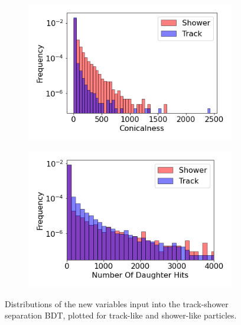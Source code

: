 \begin{figure}[bp!]
\begin{subfigure}[b]{0.45\textwidth}
            \caption{}%
        \end{subfigure}
        \hfill
        \begin{subfigure}[b]{0.45\textwidth}  
            \centering 
            \includegraphics[width=\textwidth]{Feature_Conicalness}
            \caption{}%
        \end{subfigure}
        \hfill
        \begin{subfigure}[b]{0.45\textwidth}  
            \centering 
            \includegraphics[width=\textwidth]{Feature_Number_Of_Daughter_Hits}
            \caption{}%
        \end{subfigure}
        \caption[bdt_features]{
	Distributions of the new variables input into the track-shower separation BDT, plotted for track-like and shower-like particles.
	}
        \label{fig:bdt_features}
\end{figure}

